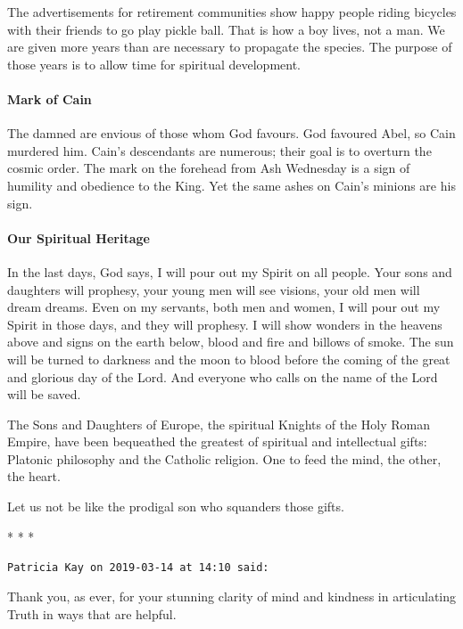 The advertisements for retirement communities show happy people riding bicycles with their friends to go play pickle ball. That is how a boy lives, not a man. We are given more years than are necessary to propagate the species. The purpose of those years is to allow time for spiritual development.

\paragraph{Mark of Cain}
The damned are envious of those whom God favours. God favoured Abel, so Cain murdered him. Cain's descendants are numerous; their goal is to overturn the cosmic order. The mark on the forehead from Ash Wednesday is a sign of humility and obedience to the King. Yet the same ashes on Cain's minions are his sign.

\paragraph{Our Spiritual Heritage}
\begin{quotex}
In the last days, God says, I will pour out my Spirit on all people. Your sons and daughters will prophesy, your young men will see visions, your old men will dream dreams. Even on my servants, both men and women, I will pour out my Spirit in those days, and they will prophesy. I will show wonders in the heavens above and signs on the earth below, blood and fire and billows of smoke. The sun will be turned to darkness and the moon to blood before the coming of the great and glorious day of the Lord. And everyone who calls on the name of the Lord will be saved. 

\end{quotex}
The Sons and Daughters of Europe, the spiritual Knights of the Holy Roman Empire, have been bequeathed the greatest of spiritual and intellectual gifts: Platonic philosophy and the Catholic religion. One to feed the mind, the other, the heart.

Let us not be like the prodigal son who squanders those gifts.




\begin{center}* * *\end{center}

\begin{footnotesize}\begin{sffamily}



\texttt{Patricia Kay on 2019-03-14 at 14:10 said: }

Thank you, as ever, for your stunning clarity of mind and kindness in articulating Truth in ways that are helpful.


\end{sffamily}\end{footnotesize}
